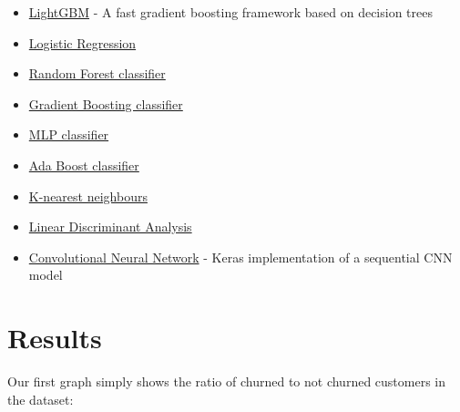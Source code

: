 \documentclass[]{article}
\begin{document}
\begin{itemize}
	\item \href{https://github.com/microsoft/LightGBM}{LightGBM} - A fast gradient boosting framework based on decision trees
	\item \href{https://scikit-learn.org/stable/modules/generated/sklearn.linear_model.LogisticRegression.html}{Logistic Regression}
	\item \href{https://scikit-learn.org/stable/modules/generated/sklearn.ensemble.RandomForestClassifier.html}{Random Forest classifier}
	\item \href{https://scikit-learn.org/stable/modules/generated/sklearn.ensemble.GradientBoostingClassifier.html}{Gradient Boosting classifier}
	\item \href{https://scikit-learn.org/stable/modules/generated/sklearn.neural_network.MLPClassifier.html}{MLP classifier}
	\item \href{https://scikit-learn.org/stable/modules/generated/sklearn.ensemble.AdaBoostClassifier.html}{Ada Boost classifier}
	\item \href{https://scikit-learn.org/stable/modules/generated/sklearn.neighbors.KNeighborsClassifier.html}{K-nearest neighbours}
	\item \href{https://scikit-learn.org/stable/modules/generated/sklearn.discriminant_analysis.LinearDiscriminantAnalysis.html}{Linear Discriminant Analysis}
	\item \href{https://keras.io/api/models/sequential/#sequential-class}{Convolutional Neural Network} - Keras implementation of a sequential CNN model
\end{itemize}

\section{Results}

Our first graph simply shows the ratio of churned to not churned customers in the dataset:
\end{document}
